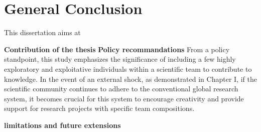 \chapter*{General Conclusion}

This dissertation aims at 

\textbf{Contribution of the thesis}
\textbf{Policy recommandations}
From a policy standpoint, this study emphasizes the significance of including a few highly exploratory and exploitative individuals within a scientific team to contribute to knowledge. In the event of an external shock, as demonstrated in Chapter I, if the scientific community continues to adhere to the conventional global research system, it becomes crucial for this system to encourage creativity and provide support for research projects with specific team compositions.

\textbf{limitations and future extensions}